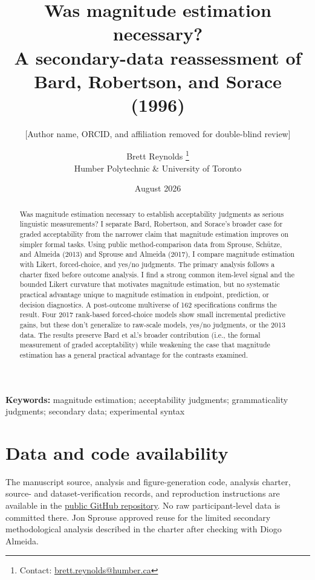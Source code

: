 \documentclass[12pt]{article}
\title{Was magnitude estimation necessary?\\
{\large A secondary-data reassessment of Bard, Robertson, and Sorace (1996)}}
\author{[Author name, ORCID, and affiliation removed for double-blind review]}
\author{Brett Reynolds \orcidlink{0000-0003-0073-7195}%
  \thanks{Contact: \href{mailto:brett.reynolds@humber.ca}{brett.reynolds@humber.ca}}\\
  Humber Polytechnic \& University of Toronto}
\date{August 2026}
\begin{document}
\maketitle

\begin{abstract}
Was magnitude estimation necessary to establish acceptability judgments as
serious linguistic measurements? I separate Bard, Robertson, and Sorace's
broader case for graded acceptability from the narrower claim that magnitude
estimation improves on simpler formal tasks. Using public method-comparison
data from Sprouse, Sch\"utze, and Almeida (2013) and Sprouse and Almeida (2017),
I compare magnitude estimation with Likert, forced-choice, and yes/no judgments.
The primary analysis follows a charter fixed before outcome analysis. I find a
strong common item-level signal and the bounded Likert curvature that motivates
magnitude estimation, but no systematic practical advantage unique to
magnitude estimation in endpoint, prediction, or decision diagnostics. A
post-outcome multiverse of 162 specifications confirms the result. Four 2017
rank-based forced-choice models show small incremental predictive gains, but
these don't generalize to raw-scale models, yes/no judgments, or the 2013 data.
The results preserve Bard et al.'s broader contribution (i.e., the formal
measurement of graded acceptability) while weakening the case that magnitude
estimation has a general practical advantage for the contrasts examined.
\end{abstract}

\noindent\textbf{Keywords:} magnitude estimation; acceptability judgments; grammaticality judgments; secondary data; experimental syntax










\section*{Data and code availability}

The manuscript source, analysis and figure-generation code, analysis charter,
source- and dataset-verification records, and reproduction instructions are
available in the
\href{https://github.com/BrettRey/bard-magnitude-estimation-reassessment}{public
GitHub repository}. No raw participant-level data is committed there. Jon
Sprouse approved reuse for the limited secondary methodological analysis
described in the charter after checking with Diogo Almeida.
\end{document}
